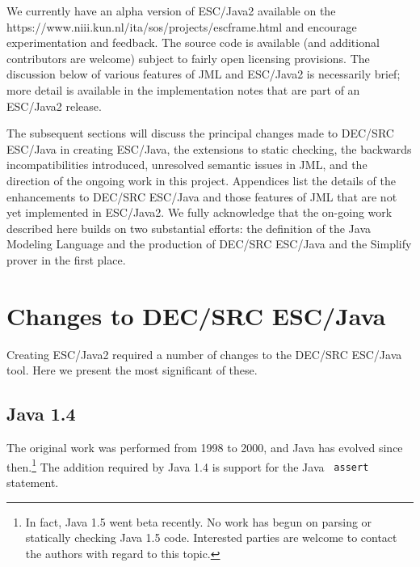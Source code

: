 \documentclass{sig-alternate}
\begin{document}
We currently have an alpha version of ESC/Java2 available on the
{https://www.niii.kun.nl/ita/sos/projects/escframe.html} and encourage
experimentation and feedback.  The source code is available
(and additional contributors are welcome) subject to fairly open
licensing provisions.  The discussion below of various features of JML
and ESC/Java2 is necessarily brief; more detail is available in the
implementation notes that are part of an ESC/Java2 release.

The subsequent sections will discuss the principal changes made to
DEC/SRC ESC/Java in creating ESC/Java, the extensions to
static checking, the backwards incompatibilities introduced,
unresolved semantic issues in JML, and the direction of the ongoing work
in this project.  Appendices list the details of the enhancements to
DEC/SRC ESC/Java and those features of JML
that are not yet implemented in ESC/Java2.  We fully acknowledge that
the on-going work described here builds on two substantial efforts:
the definition of the Java Modeling
Language
and
the production of DEC/SRC ESC/Java and the Simplify prover in
the first place.


\section{Changes to DEC/SRC ESC/Java}

Creating ESC/Java2 required a number of changes to the DEC/SRC
ESC/Java tool.  Here we present the most significant
of these.
\subsection{Java 1.4}
The original work was performed from 1998 to 2000, and Java has evolved
since then.\footnote{In fact, Java 1.5 went beta recently.  No work has begun on
  parsing or statically checking Java 1.5 code.  Interested parties
  are welcome to contact the authors with regard to this topic.}  The
addition required by Java 1.4 is support for the Java {\tt
  assert} statement.  

\end{document}
